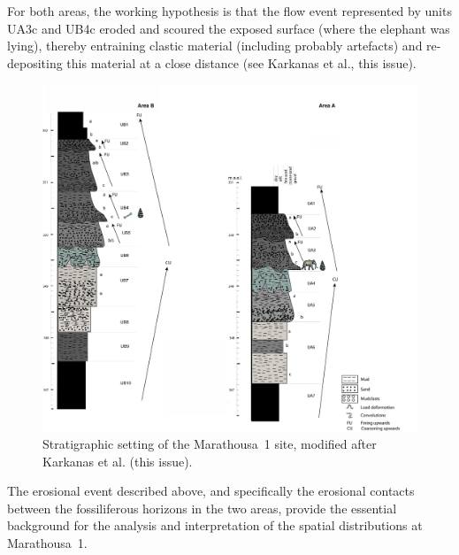 \documentclass[review,authoryear,times]{elsarticle} %
\begin{document}
For both areas, the working hypothesis is that the flow event represented by units UA3c and UB4c eroded and scoured the exposed surface (where the elephant was lying), thereby entraining clastic material (including probably artefacts) and re-depositing this material at a close distance (see Karkanas et al., this issue).

\begin{figure}[]
  \centering
  \includegraphics[width=1\textwidth]{../artwork/Fig3.pdf}
  \caption{Stratigraphic setting of the Marathousa~1 site, modified after Karkanas et al. (this issue).}
  \label{fig:3}
\end{figure}

The erosional event described above, and specifically the erosional contacts between the fossiliferous horizons in the two areas, provide the essential background for the analysis and interpretation of the spatial distributions at Marathousa~1.
\end{document}
